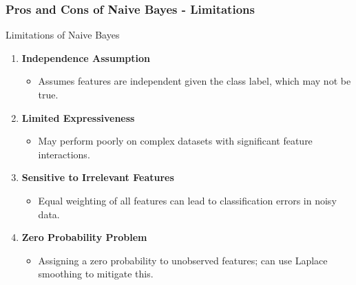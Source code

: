 \documentclass[aspectratio=169]{beamer}
\begin{document}
\begin{frame}[fragile]
    \frametitle{Pros and Cons of Naive Bayes - Limitations}
    \begin{block}{Limitations of Naive Bayes}
        \begin{enumerate}
            \item \textbf{Independence Assumption}
            \begin{itemize}
                \item Assumes features are independent given the class label, which may not be true.
            \end{itemize}
            
            \item \textbf{Limited Expressiveness}
            \begin{itemize}
                \item May perform poorly on complex datasets with significant feature interactions.
            \end{itemize}
            
            \item \textbf{Sensitive to Irrelevant Features}
            \begin{itemize}
                \item Equal weighting of all features can lead to classification errors in noisy data.
            \end{itemize}
            
            \item \textbf{Zero Probability Problem}
            \begin{itemize}
                \item Assigning a zero probability to unobserved features; can use Laplace smoothing to mitigate this.
            \end{itemize}
        \end{enumerate}
    \end{block}
\end{frame}
\end{document}
